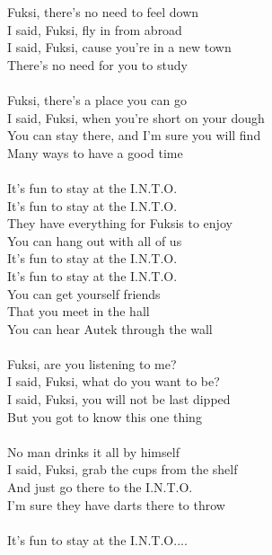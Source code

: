 
            Fuksi, there’s no need to feel down \\
            I said, Fuksi, fly in from abroad \\
            I said, Fuksi, cause you’re in a new town \\
            There’s no need for you to study \\
\hspace{10mm} \\
            Fuksi, there’s a place you can go \\
            I said, Fuksi, when you’re short on your dough \\
            You can stay there, and I’m sure you will find \\
            Many ways to have a good time \\
\hspace{10mm} \\
            It’s fun to stay at the I.N.T.O. \\
            It’s fun to stay at the I.N.T.O. \\
            They have everything for Fuksis to enjoy \\
            You can hang out with all of us \\
            It’s fun to stay at the I.N.T.O. \\
            It’s fun to stay at the I.N.T.O. \\
            You can get yourself friends \\
            That you meet in the hall \\
            You can hear Autek through the wall \\
\hspace{10mm} \\
            Fuksi, are you listening to me? \\
            I said, Fuksi, what do you want to be? \\
            I said, Fuksi, you will not be last dipped \\
            But you got to know this one thing \\
\hspace{10mm} \\
            No man drinks it all by himself \\
            I said, Fuksi, grab the cups from the shelf \\
            And just go there to the I.N.T.O. \\
            I’m sure they have darts there to throw \\
\hspace{10mm} \\
            It’s fun to stay at the I.N.T.O.... \\

